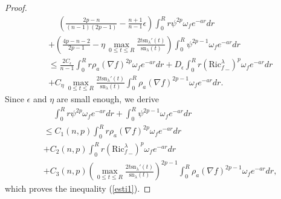 \documentclass[11pt]{amsart}
\numberwithin{equation}{section}
\newcommand{\sn}{\mathrm{sn}}
\begin{document}
\begin{proof}
\begin{equation*}
		\begin{aligned}
			&\quad\,\left(\frac{2p-n}{(n-1)(2p-1)}-\frac{n+1}{n-1}\epsilon\right)\int_{0}^{R}r\psi^{2p}\omega_fe^{-ar}dr\\
			&+\left(\frac{4p-n-2}{2p-1}-\eta\,\max_{0\leq t\leq R}\frac{2t\sn_\lambda'(t)}{\sn_\lambda(t)}\right)\int_0^R\psi^{2p-1}\omega_fe^{-ar}dr\\
			&\leq \frac{2C_\epsilon}{n-1}\int_{0}^Rr\rho_a(\nabla f)^{2p}\omega_fe^{-ar}dr+D_\epsilon\int_{0}^Rr\left({\mathrm{Ric}^\lambda_f}_-\right)^p\omega_fe^{-ar}dr\\
			&+C_\eta\,\max_{0\leq t\leq R}\frac{2t\sn_\lambda'(t)}{\sn_\lambda(t)}\int_{0}^R\rho_a(\nabla f)^{2p-1}\omega_fe^{-ar}dr.
		\end{aligned}
	\end{equation*}
	Since $\epsilon$ and $\eta$ are small enough, we derive
	\begin{equation*}
		\begin{aligned}
			&\quad\,\int_{0}^{R}r\psi^{2p}\omega_fe^{-ar}dr+\int_0^R\psi^{2p-1}\omega_fe^{-ar}dr\\
			&\leq C_1(n,p)\int_{0}^Rr\rho_a(\nabla f)^{2p}\omega_fe^{-ar}dr\\
			&+C_2(n,p)\int_{0}^Rr\left({\mathrm{Ric}^\lambda_f}_-\right)^p\omega_fe^{-ar}dr\\
			&+C_3(n,p)\left(\max_{0\leq t\leq R}\frac{2t\sn_\lambda'(t)}{\sn_\lambda(t)}\right)^{2p-1}\int_{0}^R\rho_a(\nabla f)^{2p-1}\omega_fe^{-ar}dr,
		\end{aligned}
	\end{equation*}
	which proves the inequality (\ref{esti1}).
\end{proof}
\end{document}
